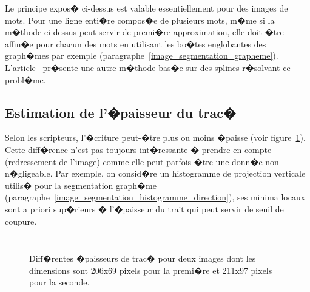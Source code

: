 Le principe expos� ci-dessus est valable essentiellement pour des images de mots. Pour une ligne enti�re compos�e de plusieurs mots, m�me si la m�thode ci-dessus peut servir de premi�re approximation, elle doit �tre affin�e pour chacun des mots en utilisant les bo�tes englobantes des graph�mes par exemple (paragraphe~\ref{image_segmentation_grapheme}). L'article~ pr�sente une autre m�thode bas�e sur des splines r�solvant ce probl�me.





















\subsection{Estimation de l'�paisseur du trac�}
\label{image_epaisseur_trace}

Selon les scripteurs, l'�criture peut-�tre plus ou moins �paisse (voir figure~\ref{image_trace_epaisseur}). Cette diff�rence n'est pas toujours int�ressante � prendre en compte (redressement de l'image) comme elle peut parfois �tre une donn�e non n�gligeable. Par exemple, on consid�re un histogramme de projection verticale utilis� pour la segmentation graph�me (paragraphe~\ref{image_segmentation_histogramme_direction}), ses minima locaux sont a priori sup�rieurs � l'�paisseur du trait qui peut servir de seuil de coupure.



            \begin{figure}[ht]
        $$\begin{array}{|c|c|}\hline 
        \texttt{[image: \\filext\{../image/image/attitude1]}} &
        \texttt{[image: \\filext\{../image/image/attitude2]}} \\ \hline
        \end{array}$$
        \caption{    Diff�rentes �paisseurs de trac� pour deux images dont les dimensions sont 206x69 pixels 
                            pour la premi�re et 211x97 pixels pour la seconde.}
        \label{image_trace_epaisseur}
            \end{figure}

